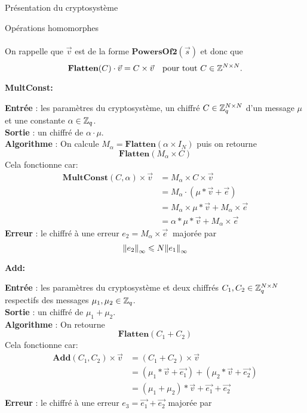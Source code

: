 \begin{section}{Présentation du cryptosystème}
\begin{subsection}{Opérations homomorphes}
\paragraph{}
On rappelle que $\vec{v}$ est de la forme $\textbf{PowersOf2}(\vec{s})$ et donc que
\[\textbf{Flatten}(C) \cdot \vec{v} = C \times \vec{v}\quad \text{pour tout $C\in \mathbb{Z}^{N \times N}$.} \]
	
\vspace{0.5cm}\noindent\textbf{MultConst:}
\flushleft
	
	\textbf{Entrée} : les paramètres du cryptosystème, un chiffré $C \in \mathbb{Z}_q^{N \times N}$ d'un message $\mu$ et une constante $\alpha \in \mathbb{Z}_q$. \\
	\textbf{Sortie} : un chiffré de $\alpha \cdot \mu$.\\
	\textbf{Algorithme} : On calcule $M_{\alpha} = \textbf{Flatten}(\alpha \times I_N)$ puis on retourne 
	\[\textbf{Flatten}(M_{\alpha} \times C)\]
	Cela fonctionne car:
	\begin{align*}
	\textbf{MultConst}(C, \alpha) \times \vec{v} &= M_{\alpha} \times C \times \vec{v} \\
	&= M_{\alpha} \cdot (\mu * \vec{v} + \vec{e}) \\
	&= M_{\alpha} \times \mu * \vec{v} + M_{\alpha} \times \vec{e} \\
	&= \alpha * \mu * \vec{v} + M_{\alpha} \times \vec{e}
	\end{align*}
	\textbf{Erreur} : le chiffré à une erreur $e_2 = M_\alpha \times \vec{e}\:$ majorée par
		\[{\|e_2\|}_{\infty} \leqslant N {\|e_1\|}_{\infty}\]

\vspace{0.5cm}\noindent\textbf{Add:}
\flushleft
	
	\textbf{Entrée} : les paramètres du cryptosystème et deux chiffrés $C_1, C_2 \in \mathbb{Z}_q^{N \times N}$ respectifs des messages $\mu_1, \mu_2 \in \mathbb{Z}_q$.\\
	\textbf{Sortie} : un chiffré de $\mu_1 + \mu_2$.\\
	\textbf{Algorithme} : On retourne 
	\[\textbf{Flatten}(C_1 + C_2)\]
	Cela fonctionne car:
	\begin{align*}
	\textbf{Add}(C_1, C_2) \times \vec{v} &= (C_1 + C_2) \times \vec{v} \\
	&= (\mu_1 * \vec{v} + \vec{e_1}) + (\mu_2 * \vec{v} + \vec{e_2}) \\
	&= (\mu_1 + \mu_2) * \vec{v} + \vec{e_1} + \vec{e_2}
	\end{align*}
\textbf{Erreur} : le chiffré à une erreur $e_3 = \vec{e_1} + \vec{e_2}$ majorée par


\end{subsection}
\end{section}
